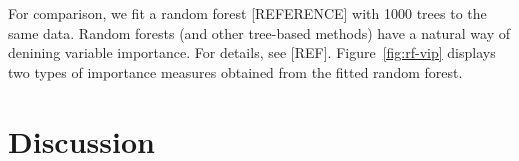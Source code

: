 \documentclass{article}
\begin{document}
For comparison, we fit a random forest [REFERENCE] with 1000 trees to the same data. Random forests (and other tree-based methods) have a natural way of denining variable importance. For details, see [REF]. Figure~\ref{fig:rf-vip} displays two types of importance measures obtained from the fitted random forest.


\section{Discussion}



\end{document}
